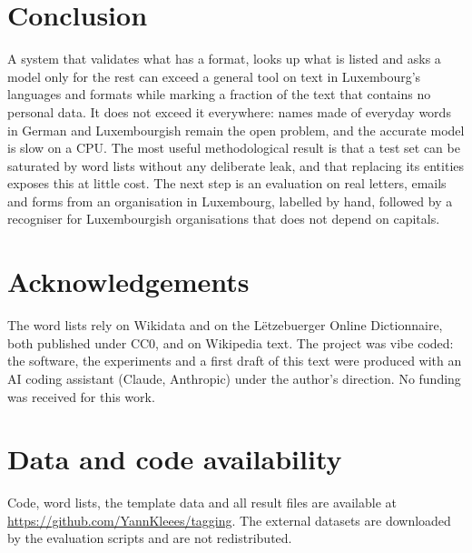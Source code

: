 \documentclass[10pt,a4paper,twocolumn]{article}
\begin{document}
\section{Conclusion}

A system that validates what has a format, looks up what is listed and asks a model only for the
rest can exceed a general tool on text in Luxembourg's languages and formats while marking a
fraction of the text that contains no personal data. It does not exceed it everywhere: names made
of everyday words in German and Luxembourgish remain the open problem, and the accurate model is
slow on a CPU. The most useful methodological result is that a test set can be saturated by word
lists without any deliberate leak, and that replacing its entities exposes this at little cost.
The next step is an evaluation on real letters, emails and forms from an organisation in
Luxembourg, labelled by hand, followed by a recogniser for Luxembourgish organisations that does
not depend on capitals.

\section*{Acknowledgements}

The word lists rely on Wikidata and on the L\"etzebuerger Online Dictionnaire, both published
under CC0, and on Wikipedia text. The project was vibe coded: the software, the experiments
and a first draft of this text were produced with an AI coding assistant (Claude, Anthropic)
under the author's direction. No funding was received for this work.

\section*{Data and code availability}

Code, word lists, the template data and all result files are available at
\url{https://github.com/YannKleees/tagging}. The external datasets are downloaded by the
evaluation scripts and are not redistributed.



\end{document}
